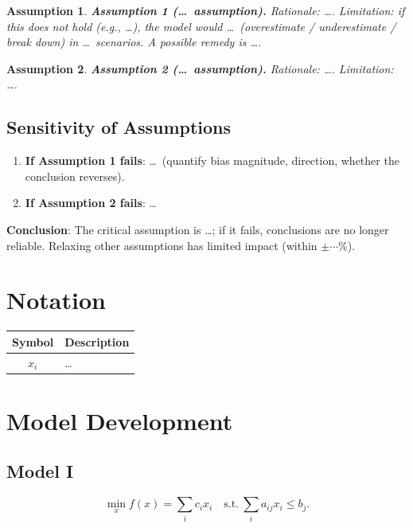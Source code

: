 \documentclass[12pt]{article}
\newtheorem{assumption}{Assumption}
\begin{document}
\begin{assumption}
\textbf{Assumption 1 (\ldots\ assumption).} Rationale: \ldots.
Limitation: if this does not hold (e.g., \ldots), the model would
\ldots\ (overestimate / underestimate / break down) in \ldots\ scenarios.
A possible remedy is \ldots.
\end{assumption}

\begin{assumption}
\textbf{Assumption 2 (\ldots\ assumption).} Rationale: \ldots. Limitation: \ldots.
\end{assumption}

\subsection{Sensitivity of Assumptions}
\begin{enumerate}[label=(\arabic*)]
  \item \textbf{If Assumption 1 fails}: \ldots\ (quantify bias magnitude, direction,
        whether the conclusion reverses).
  \item \textbf{If Assumption 2 fails}: \ldots
\end{enumerate}
\textbf{Conclusion}: The critical assumption is \ldots; if it fails, conclusions
are no longer reliable. Relaxing other assumptions has limited impact
(within $\pm\cdots\%$).
\FloatBarrier

\section{Notation}
\begin{center}
\begin{tabular}{cl}
\toprule
Symbol & Description \\
\midrule
$x_i$ & \ldots \\
\bottomrule
\end{tabular}
\end{center}
\FloatBarrier

\section{Model Development}
\subsection{Model I}
\begin{equation}
\min_x f(x)=\sum_i c_i x_i \quad \text{s.t.}\ \sum_i a_{ij}x_i\le b_j .
\end{equation}
\end{document}
